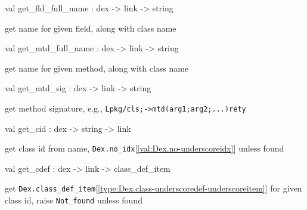 \documentclass[11pt]{article}
\begin{document}
\label{val:Dex.get-underscorefld-underscorefull-underscorename}\begin{ocamldoccode}
val get_fld_full_name : dex -> link -> string
\end{ocamldoccode}
\begin{ocamldocdescription}
get name for given field, along with class name


\end{ocamldocdescription}




\label{val:Dex.get-underscoremtd-underscorefull-underscorename}\begin{ocamldoccode}
val get_mtd_full_name : dex -> link -> string
\end{ocamldoccode}
\begin{ocamldocdescription}
get name for given method, along with class name


\end{ocamldocdescription}




\label{val:Dex.get-underscoremtd-underscoresig}\begin{ocamldoccode}
val get_mtd_sig : dex -> link -> string
\end{ocamldoccode}
\begin{ocamldocdescription}
get method signature, e.g., {\tt{Lpkg/cls;->mtd(arg1;arg2;...)rety}}


\end{ocamldocdescription}




\label{val:Dex.get-underscorecid}\begin{ocamldoccode}
val get_cid : dex -> string -> link
\end{ocamldoccode}
\begin{ocamldocdescription}
get class id from name, {\tt{Dex.no\_idx}}[\ref{val:Dex.no-underscoreidx}] unless found


\end{ocamldocdescription}




\label{val:Dex.get-underscorecdef}\begin{ocamldoccode}
val get_cdef : dex -> link -> class_def_item
\end{ocamldoccode}
\begin{ocamldocdescription}
get {\tt{Dex.class\_def\_item}}[\ref{type:Dex.class-underscoredef-underscoreitem}] for given class id,
 raise {\tt{Not\_found}} unless found


\end{ocamldocdescription}
\end{document}
